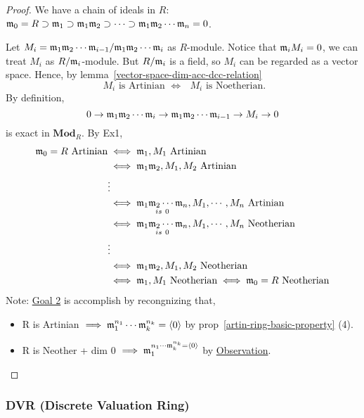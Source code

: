 \begin{proof}
  We have a chain of ideals in $R$:
  $\mathfrak{m}_0 = R \supset \mathfrak{m}_1 \supset \mathfrak{m}_1\mathfrak{m}_2 \supset \dots \supset
  \mathfrak{m}_1\mathfrak{m}_2\dotsm\mathfrak{m}_n = 0$.

  Let $M_i = {\mathfrak{m}_1\mathfrak{m}_2\dotsm\mathfrak{m}_{i-1}}/{\mathfrak{m}_1\mathfrak{m}_2\dotsm\mathfrak{m}_i}$
  as $R$-module.
  Notice that $\mathfrak{m}_i M_i = 0$, we can treat $M_i$ as ${R}/{\mathfrak{m}_i}$-module.
  But ${R}/{\mathfrak{m}_i}$ is a field, so $M_i$ can be regarded as a vector
  space. Hence, by lemma~\ref{vector-space-dim-acc-dcc-relation}
  \[ 
  \text{ $M_i$ is Artinian $\iff$ $M_i$ is Noetherian. } 
  \]
  By definition, 
  $$
  0 \to \mathfrak{m}_1\mathfrak{m}_2\dotsm\mathfrak{m}_i \to \mathfrak{m}_1\mathfrak{m}_2\dotsm\mathfrak{m}_{i-1}
  \to M_i \to 0
  $$
  is exact in $\mathbf{Mod}_R$.
  By Ex1,
  $$
    \begin{aligned}
      \mathfrak{m}_0 = R \text{ Artinian} & \iff \mathfrak{m}_1 , M_1 \text{ Artinian} \\
                & \iff \mathfrak{m}_1 \mathfrak{m}_2 , M_1, M_2 \text{ Artinian} \\
                & \vdots \\
                & \iff \underset{is\ 0}{\mathfrak{m}_1 \mathfrak{m}_2 \cdots \mathfrak{m}_n}, M_1, 
                \cdots, M_n \text{ Artinian} \\
                & \iff \underset{is\ 0}{\mathfrak{m}_1 \mathfrak{m}_2 \cdots \mathfrak{m}_n}, M_1, 
                \cdots, M_n \text{ Neotherian} \\
                & \vdots \\
                & \iff \mathfrak{m}_1 \mathfrak{m}_2 , M_1, M_2 \text{ Neotherian} \\
                & \iff \mathfrak{m}_1 , M_1 \text{ Neotherian} \iff \mathfrak{m}_0 = R \text{ Neotherian}\\
    \end{aligned}
  $$
  Note: \underline{Goal 2} is accomplish by recongnizing that,
  \begin{itemize}
    \item R is Artinian $\implies \mathfrak{m}_1^{n_1}\cdots \mathfrak{m}_k^{n_k} = \langle0\rangle$ by prop~\ref{artin-ring-basic-property} (4).
    \item R is Neother + dim 0 $\implies \mathfrak{m}_1^{n_1\cdots \mathfrak{m}_k^{n_k} = \langle0\rangle}$ by \underline{Observation}.
  \end{itemize}
\end{proof}


\subsubsection{DVR (Discrete Valuation Ring)}

